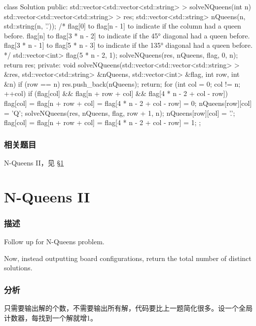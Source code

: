 \begin{Code}
class Solution {
public:
    std::vector<std::vector<std::string> > solveNQueens(int n) {
        std::vector<std::vector<std::string> > res;
        std::vector<std::string> nQueens(n, std::string(n, '.'));
        /*
        flag[0] to flag[n - 1] to indicate if the column had a queen before.
        flag[n] to flag[3 * n - 2] to indicate if the 45° diagonal had a queen before.
        flag[3 * n - 1] to flag[5 * n - 3] to indicate if the 135° diagonal had a queen before.
        */
        std::vector<int> flag(5 * n - 2, 1);
        solveNQueens(res, nQueens, flag, 0, n);
        return res;
    }
private:
    void solveNQueens(std::vector<std::vector<std::string> > &res, std::vector<std::string> &nQueens, std::vector<int> &flag, int row, int &n) {
        if (row == n) {
            res.push_back(nQueens);
            return;
        }
        for (int col = 0; col != n; ++col)
            if (flag[col] && flag[n + row + col] && flag[4 * n - 2 + col - row]) {
                flag[col] = flag[n + row + col] = flag[4 * n - 2 + col - row] = 0;
                nQueens[row][col] = 'Q';
                solveNQueens(res, nQueens, flag, row + 1, n);
                nQueens[row][col] = '.';
                flag[col] = flag[n + row + col] = flag[4 * n - 2 + col - row] = 1;
            }
    }
};
\end{Code}

\subsubsection{相关题目}
\begindot
\item N-Queens II，见 \S \ref{sec:n-queens-ii}
\myenddot


\section{N-Queens II} %
\label{sec:n-queens-ii}


\subsubsection{描述}
Follow up for N-Queens problem.

Now, instead outputting board configurations, return the total number of distinct solutions.


\subsubsection{分析}
只需要输出解的个数，不需要输出所有解，代码要比上一题简化很多。设一个全局计数器，每找到一个解就增1。


